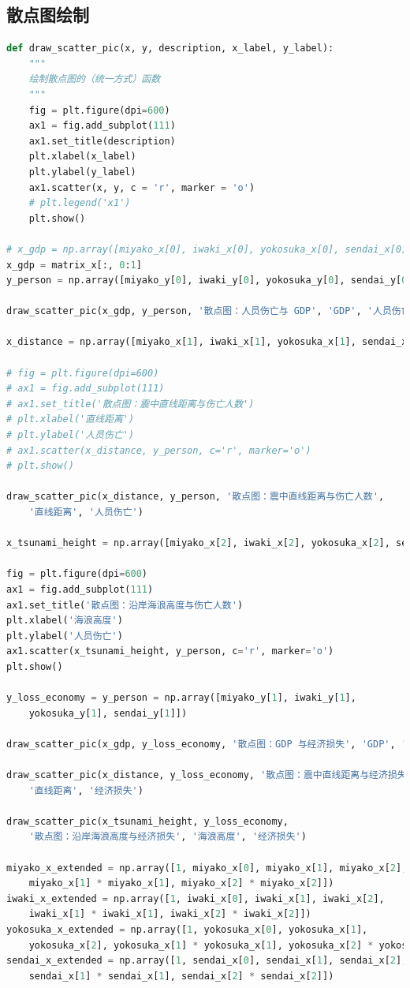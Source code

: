 \documentclass[UTF8]{ctexart}
\begin{document}
\subsection{散点图绘制}
\begin{lstlisting}[language=Python]
def draw_scatter_pic(x, y, description, x_label, y_label):
    """
    绘制散点图的（统一方式）函数
    """
    fig = plt.figure(dpi=600)
    ax1 = fig.add_subplot(111)
    ax1.set_title(description)  
    plt.xlabel(x_label)
    plt.ylabel(y_label)
    ax1.scatter(x, y, c = 'r', marker = 'o')
    # plt.legend('x1')
    plt.show()

# x_gdp = np.array([miyako_x[0], iwaki_x[0], yokosuka_x[0], sendai_x[0]])
x_gdp = matrix_x[:, 0:1]
y_person = np.array([miyako_y[0], iwaki_y[0], yokosuka_y[0], sendai_y[0]])

draw_scatter_pic(x_gdp, y_person, '散点图：人员伤亡与 GDP', 'GDP', '人员伤亡')

x_distance = np.array([miyako_x[1], iwaki_x[1], yokosuka_x[1], sendai_x[1]])

# fig = plt.figure(dpi=600)
# ax1 = fig.add_subplot(111)
# ax1.set_title('散点图：震中直线距离与伤亡人数')
# plt.xlabel('直线距离')
# plt.ylabel('人员伤亡')
# ax1.scatter(x_distance, y_person, c='r', marker='o')
# plt.show()

draw_scatter_pic(x_distance, y_person, '散点图：震中直线距离与伤亡人数',
    '直线距离', '人员伤亡')

x_tsunami_height = np.array([miyako_x[2], iwaki_x[2], yokosuka_x[2], sendai_x[2]])

fig = plt.figure(dpi=600)
ax1 = fig.add_subplot(111)
ax1.set_title('散点图：沿岸海浪高度与伤亡人数')
plt.xlabel('海浪高度')
plt.ylabel('人员伤亡')
ax1.scatter(x_tsunami_height, y_person, c='r', marker='o')
plt.show()

y_loss_economy = y_person = np.array([miyako_y[1], iwaki_y[1],
    yokosuka_y[1], sendai_y[1]])

draw_scatter_pic(x_gdp, y_loss_economy, '散点图：GDP 与经济损失', 'GDP', '经济损失')

draw_scatter_pic(x_distance, y_loss_economy, '散点图：震中直线距离与经济损失', 
    '直线距离', '经济损失')

draw_scatter_pic(x_tsunami_height, y_loss_economy, 
    '散点图：沿岸海浪高度与经济损失', '海浪高度', '经济损失')

miyako_x_extended = np.array([1, miyako_x[0], miyako_x[1], miyako_x[2],
    miyako_x[1] * miyako_x[1], miyako_x[2] * miyako_x[2]])
iwaki_x_extended = np.array([1, iwaki_x[0], iwaki_x[1], iwaki_x[2], 
    iwaki_x[1] * iwaki_x[1], iwaki_x[2] * iwaki_x[2]])
yokosuka_x_extended = np.array([1, yokosuka_x[0], yokosuka_x[1], 
    yokosuka_x[2], yokosuka_x[1] * yokosuka_x[1], yokosuka_x[2] * yokosuka_x[2]])
sendai_x_extended = np.array([1, sendai_x[0], sendai_x[1], sendai_x[2], 
    sendai_x[1] * sendai_x[1], sendai_x[2] * sendai_x[2]])


\end{lstlisting}
\end{document}
